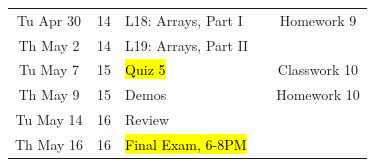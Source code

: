 \documentclass[letter,11pt]{article}
\begin{document}
\begin{tabular}{c c l l c}
Tu Apr 30 & 14 & L18: Arrays, Part I & & Homework 9 \\
Th May 2 & 14 & L19: Arrays, Part II  &  &  \\
Tu May 7 & 15 & \hl{Quiz 5} & & Classwork 10 \\
Th May 9 & 15 & Demos &  & Homework 10 \\
Tu May 14 & 16 & Review & \\
Th May 16 & 16 & \hl{Final Exam, 6-8PM} & \\
\end{tabular}



\end{document}
